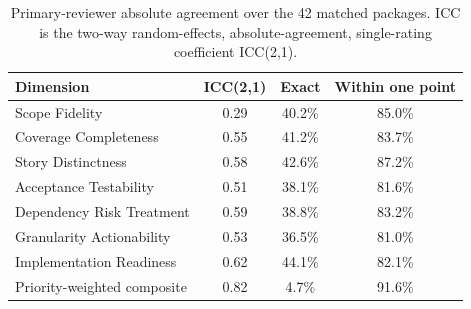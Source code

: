 \begin{table}[H]
\caption{Primary-reviewer absolute agreement over the 42 matched packages. ICC is the two-way random-effects, absolute-agreement, single-rating coefficient ICC(2,1).}
\label{tab:matched-review-reliability}
\centering
\small
\begin{tabular}{lccc}
\toprule
Dimension & ICC(2,1) & Exact & Within one point \\ 
\midrule
Scope Fidelity & 0.29 & 40.2\% & 85.0\% \\
Coverage Completeness & 0.55 & 41.2\% & 83.7\% \\
Story Distinctness & 0.58 & 42.6\% & 87.2\% \\
Acceptance Testability & 0.51 & 38.1\% & 81.6\% \\
Dependency Risk Treatment & 0.59 & 38.8\% & 83.2\% \\
Granularity Actionability & 0.53 & 36.5\% & 81.0\% \\
Implementation Readiness & 0.62 & 44.1\% & 82.1\% \\
Priority-weighted composite & 0.82 & 4.7\% & 91.6\% \\
\bottomrule
\end{tabular}
\end{table}
